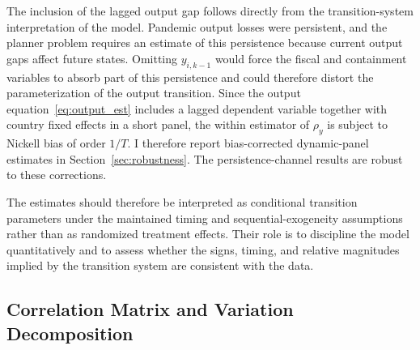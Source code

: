 \documentclass[12pt, a4paper]{article}
\begin{document}
The inclusion of the lagged output gap follows directly from the
transition-system interpretation of the model. Pandemic output losses were
persistent, and the planner problem requires an estimate of this persistence
because current output gaps affect future states. Omitting $y_{i,k-1}$ would
force the fiscal and containment variables to absorb part of this persistence
and could therefore distort the parameterization of the output transition.
Since the output equation~\eqref{eq:output_est} includes a lagged dependent
variable together with country fixed effects in a short panel, the within
estimator of $\rho_y$ is subject to Nickell bias of order $1/T$. I therefore
report bias-corrected dynamic-panel estimates in Section~\ref{sec:robustness}.
The persistence-channel results are robust to these corrections.

The estimates should therefore be interpreted as conditional transition parameters under the maintained timing and sequential-exogeneity assumptions rather than as randomized treatment effects. Their role is to discipline the model quantitatively and to assess whether the signs, timing, and relative magnitudes implied by the transition system are consistent with the data.

\subsection{Correlation Matrix and Variation Decomposition}
\label{sec:correlation_matrix}
\end{document}
